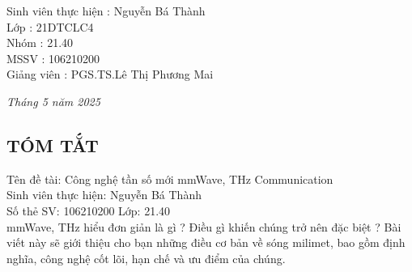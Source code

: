 \documentclass[a4paper,13pt]{article} %
\begin{document}
\begin{titlepage}
\begin{flushleft}
\hspace{4cm}Sinh viên thực hiện \hspace{0.05cm}: Nguyễn Bá Thành \\
\hspace{4cm}Lớp \hspace{3.2cm}: 21DTCLC4 \\
\hspace{4cm}Nhóm \hspace{2.7cm}: 21.40 \\
\hspace{4cm}MSSV \hspace{2.7cm}: 106210200 \\
\hspace{4cm}Giảng viên \hspace{1.8cm}: PGS.TS.Lê Thị Phương Mai \\
\end{flushleft}
\vspace{3cm}
\begin{center}
    \textit{Tháng 5 năm 2025}
\end{center}
\end{titlepage}

\begin{center}
\section{TÓM TẮT}
\end{center}
Tên đề tài: Công nghệ tần số mới mmWave, THz Communication \\
Sinh viên thực hiện: Nguyễn Bá Thành\\
Số thẻ SV: 106210200 Lớp: 21.40 \\

mmWave, THz hiểu đơn giản là gì ? Điều gì khiến chúng trở nên đặc biệt ? Bài viết này sẽ giới thiệu cho bạn những điều cơ bản về sóng milimet, bao gồm định nghĩa, công nghệ cốt lõi, hạn chế và ưu điểm của chúng.
\end{document}
